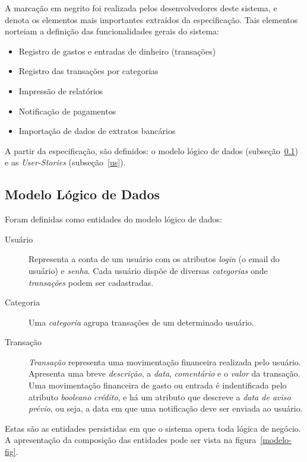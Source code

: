 \documentclass[12pt]{article}
\begin{document}
A marcação em negrito foi realizada pelos desenvolvedores deste sistema, e denota os elementos mais importantes extraídos da especificação. Tais elementos norteiam a definição das funcionalidades gerais do sistema:
    
\begin{itemize}
 \item Registro de gastos e entradas de dinheiro (transações)
 \item Registro das transações por categorias
 \item Impressão de relatórios
 \item Notificação de pagamentos
 \item Importação de dados de extratos bancários
\end{itemize}

A partir da especificação, são definidos: o modelo lógico de dados (subseção~\ref{modelo}) e as \textit{User-Stories} (subseção~\ref{us}).

\subsection{Modelo Lógico de Dados}
\label{modelo}

Foram definidas como entidades do modelo lógico de dados:

\begin{description}
 \item [Usuário] Representa a conta de um usuário com os atributos \textit{login} (o email do usuário) e \textit{senha}. Cada usuário dispõe de diversas \textit{categorias} onde \textit{transações} podem ser cadastradas.
 \item [Categoria] Uma \textit{categoria} agrupa transações de um determinado usuário.
 \item [Transação] \textit{Transação} representa uma movimentação financeira realizada pelo usuário. Apresenta uma breve \textit{descrição}, a \textit{data}, \textit{comentário} e o \textit{valor} da transação. Uma movimentação financeira de gasto ou entrada é indentificada pelo atributo \textit{booleano} \textit{crédito}, e há um atributo que descreve a \textit{data de aviso prévio}, ou seja, a data em que uma notificação deve ser enviada ao usuário.
\end{description}

Estas são as entidades persistidas em que o sistema opera toda lógica de negócio. A apresentação da composição das entidades pode ser vista na figura~\ref{modelo-fig}.
\end{document}
